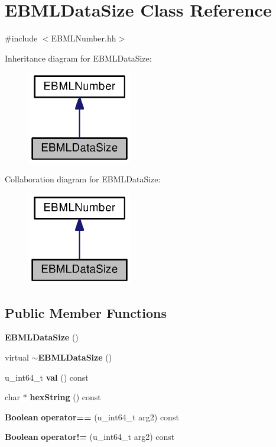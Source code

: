 \section{E\+B\+M\+L\+Data\+Size Class Reference}
\label{classEBMLDataSize}


{\ttfamily \#include $<$E\+B\+M\+L\+Number.\+hh$>$}



Inheritance diagram for E\+B\+M\+L\+Data\+Size\+:
\nopagebreak
\begin{figure}[H]
\begin{center}
\leavevmode
\includegraphics[width=130pt]{classEBMLDataSize__inherit__graph}
\end{center}
\end{figure}


Collaboration diagram for E\+B\+M\+L\+Data\+Size\+:
\nopagebreak
\begin{figure}[H]
\begin{center}
\leavevmode
\includegraphics[width=130pt]{classEBMLDataSize__coll__graph}
\end{center}
\end{figure}
\subsection*{Public Member Functions}
\begin{DoxyCompactItemize}
\item 
{\bf E\+B\+M\+L\+Data\+Size} ()
\item 
virtual {\bf $\sim$\+E\+B\+M\+L\+Data\+Size} ()
\item 
u\+\_\+int64\+\_\+t {\bf val} () const 
\item 
char $\ast$ {\bf hex\+String} () const 
\item 
{\bf Boolean} {\bf operator==} (u\+\_\+int64\+\_\+t arg2) const 
\item 
{\bf Boolean} {\bf operator!=} (u\+\_\+int64\+\_\+t arg2) const 
\end{DoxyCompactItemize}
